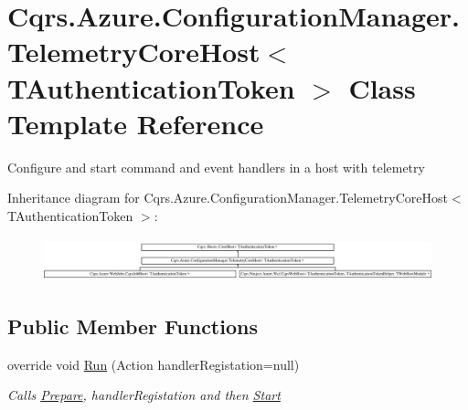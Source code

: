 \hypertarget{classCqrs_1_1Azure_1_1ConfigurationManager_1_1TelemetryCoreHost}{}\section{Cqrs.\+Azure.\+Configuration\+Manager.\+Telemetry\+Core\+Host$<$ T\+Authentication\+Token $>$ Class Template Reference}
\label{classCqrs_1_1Azure_1_1ConfigurationManager_1_1TelemetryCoreHost}


Configure and start command and event handlers in a host with telemetry  


Inheritance diagram for Cqrs.\+Azure.\+Configuration\+Manager.\+Telemetry\+Core\+Host$<$ T\+Authentication\+Token $>$\+:\begin{figure}[H]
\begin{center}
\leavevmode
\includegraphics[height=1.284404cm]{classCqrs_1_1Azure_1_1ConfigurationManager_1_1TelemetryCoreHost}
\end{center}
\end{figure}
\subsection*{Public Member Functions}
\begin{DoxyCompactItemize}
\item 
override void \hyperlink{classCqrs_1_1Azure_1_1ConfigurationManager_1_1TelemetryCoreHost_a1d7406fe5dd09d6d6e449522a0a2f637_a1d7406fe5dd09d6d6e449522a0a2f637}{Run} (Action handler\+Registation=null)
\begin{DoxyCompactList}\small\item\em Calls \hyperlink{classCqrs_1_1Azure_1_1ConfigurationManager_1_1TelemetryCoreHost_a620cb9c1ceb78a8f23b45ae749199fd4_a620cb9c1ceb78a8f23b45ae749199fd4}{Prepare}, {\itshape handler\+Registation}  and then \hyperlink{classCqrs_1_1Azure_1_1ConfigurationManager_1_1TelemetryCoreHost_a37c8e3f829743d6be1108b3fd8a5a3e7_a37c8e3f829743d6be1108b3fd8a5a3e7}{Start} \end{DoxyCompactList}\end{DoxyCompactItemize}

